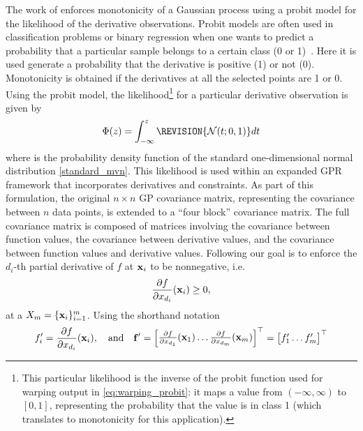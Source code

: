 \label{constrained_likelihood_with_derivative_information}
The work of  enforces monotonicity of a Gaussian process using a probit model for the likelihood of the derivative observations.
Probit models are often used in classification problems or binary regression when one wants to predict a probability that a
particular sample belongs to a certain class (0 or 1)~.  
Here it is used generate a probability that the 
derivative is positive (1) or not (0). Monotonicity is obtained if the derivatives at all the selected points are 1 or 0. 
Using the probit model, the likelihood\footnote{This particular likelihood is the inverse of the probit function used for warping output in  \eqref{eq:warping_probit}:  
it maps a value from $(-\infty,\infty)$ to $[0,1]$, representing the probability that the value is in class 1 (which translates to monotonicity for this application).} for a particular derivative observation is given by 
\begin{equation}
\Phi(z) = \int_{-\infty}^{z} \REVISION{\mathcal{N}(t;0,1)} dt
\end{equation}
where  is the probability density function of the standard one-dimensional normal distribution \eqref{standard_mvn}.  This likelihood is used within an expanded GPR framework that incorporates derivatives and constraints.
As part of this formulation, the original $n \times n$ GP covariance matrix, representing 
the covariance between $n$ data points, is extended to a
``four block'' covariance matrix. The full covariance 
matrix is composed of matrices involving the covariance between
function values, the covariance between derivative values, and the covariance
between function values and derivative values. 
Following  our goal is to enforce the $d_i$-th partial derivative of $f$ at $\bold{x}_i$ to be nonnegative, i.e.
\begin{equation}\label{eq:discrete_monotonicity}
\frac{\partial f}{\partial x_{d_i}} (\bold{x}_i) \ge 0, 
\end{equation}
at a  $X_m=\{\bold{x}_i\}_{i=1}^m$. 
Using the shorthand notation
\begin{equation}\label{eq:notation_f}
f'_i = \frac{\partial f}{\partial x_{d_i}} (\bold{x}_i), \quad\text{and}\quad
\bold{f}' =
\begin{bmatrix}
\frac{\partial f}{\partial x_{d_1}}(\bold{x}_1) 
\hdots
\frac{\partial f}{\partial x_{d_m}}(\bold{x}_m) 	
\end{bmatrix}^\top
=
\begin{bmatrix}
f'_1
\hdots
f'_m	
\end{bmatrix}^\top
\end{equation}
